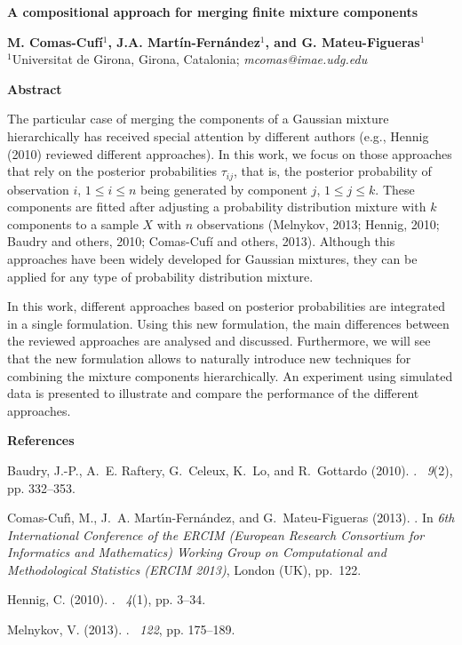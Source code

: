 \documentclass [10pt]{article}
\begin{document}
\begin{center}
\textbf{\large A compositional approach for merging finite mixture components}

\vskip 0.25cm

\textbf{M. Comas-Cufí}$^{1}$\textbf{, J.A. Martín-Fernández}$^{1}$\textbf{, and
G. Mateu-Figueras}$^{1}$ \\
{\small $^{1}$Universitat de Girona, Girona, Catalonia;
\textit{mcomas@imae.udg.edu}}
\end{center}

\vskip 0.5cm {\centerline{\bf Abstract}}

The particular case of merging the components of a Gaussian mixture hierarchically has received special attention by different authors (e.g., Hennig (2010) reviewed different approaches). In this work, we focus on those approaches that rely on the posterior probabilities $\tau_{ij}$, that is, the posterior probability of observation $i$, $1 \leq i \leq n$ being generated by component $j$, $1\leq j\leq k$. These components are fitted after adjusting a  probability distribution mixture with $k$ components  to a sample $X$ with $n$ observations (Melnykov, 2013; Hennig, 2010; Baudry and others, 2010; Comas-Cufí and others, 2013).  Although this approaches have been widely developed for Gaussian mixtures, they can be applied for any type of probability distribution mixture.

In this work, different approaches based on posterior probabilities are integrated in a single formulation. Using this new formulation, the main differences between the reviewed approaches are analysed and discussed. Furthermore, we will see that the new formulation allows to naturally introduce new techniques for combining the mixture components hierarchically.  An experiment using simulated data is presented to illustrate and compare the performance of the different approaches.

\vskip 0.2cm {\bf References}

\vspace{0.5mm}
\hangindent=0.5cm  %
Baudry, J.-P., A.~E. Raftery, G.~Celeux, K.~Lo, and R.~Gottardo (2010).
.
~{\em 9\/}(2), pp. 332--353.

\hangindent=0.5cm  %
Comas-Cuf\'{\i}, M., J.~A. Mart\'{\i}n-Fern\'{a}ndez, and G.~Mateu-Figueras
  (2013).
.
\newblock In {\em 6th International Conference of the ERCIM (European Research
  Consortium for Informatics and Mathematics) Working Group on Computational
  and Methodological Statistics (ERCIM 2013)}, London (UK), pp.\  122.

\hangindent=0.5cm  %
Hennig, C. (2010).
.
~{\em 4\/}(1), pp.  3--34.

\hangindent=0.5cm  %
Melnykov, V. (2013).
.
~{\em 122}, pp. 175--189.
\end{document}
